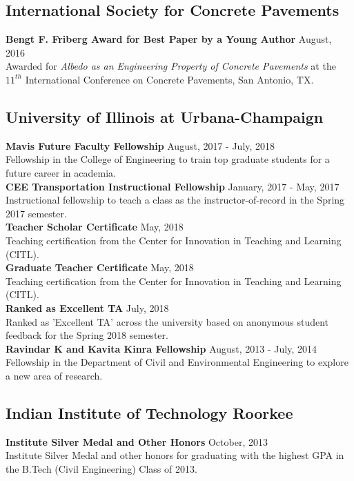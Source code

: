 \documentclass[12pt]{article}
\begin{document}
\subsection*{International Society for Concrete Pavements}
\textbf{Bengt F. Friberg Award for Best Paper by a Young Author} \hfill August, 2016 \\
Awarded for \textit{Albedo as an Engineering Property of Concrete Pavements} at the $11^{th}$ International Conference on Concrete Pavements, San Antonio, TX. \\

\subsection*{University of Illinois at Urbana-Champaign} 
\textbf{Mavis Future Faculty Fellowship} \hfill August, 2017 - July, 2018 \\
Fellowship in the College of Engineering to train top graduate students for a future career in academia. \\

\textbf{CEE Transportation Instructional Fellowship} \hfill January, 2017 - May, 2017 \\
Instructional fellowship to teach a class as the instructor-of-record in the Spring 2017 semester. \\

\textbf{Teacher Scholar Certificate} \hfill May, 2018 \\
Teaching certification from the Center for Innovation in Teaching and Learning (CITL). \\

\textbf{Graduate Teacher Certificate} \hfill May, 2018 \\
Teaching certification from the Center for Innovation in Teaching and Learning (CITL). \\

\textbf{Ranked as Excellent TA} \hfill July, 2018 \\
Ranked as 'Excellent TA' across the university based on anonymous student feedback for the Spring 2018 semester. \\

\textbf{Ravindar K and Kavita Kinra Fellowship} \hfill August, 2013 - July, 2014 \\
Fellowship in the Department of Civil and Environmental Engineering to explore a new area of research. \\


\subsection*{Indian Institute of Technology Roorkee} 
\textbf{Institute Silver Medal and Other Honors} \hfill October, 2013 \\
Institute Silver Medal and other honors for graduating with the highest GPA in the B.Tech (Civil Engineering) Class of 2013. \\
\end{document}
